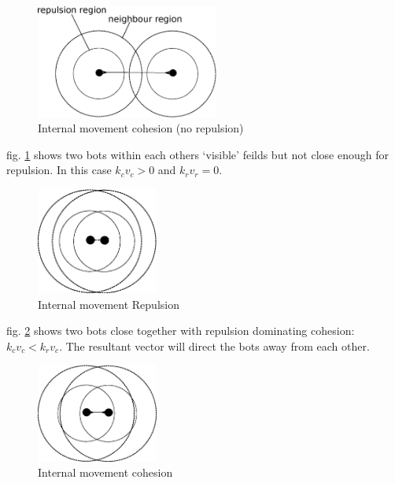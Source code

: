 \documentclass[10pt,journal,letterpaper,twoside]{IEEEtran}
\newcommand{\Stability}{Internal movement}
\newcommand{\Fig}{fig.}
\begin{document}
\begin{figure}[H]
\begin{center}
\includegraphics[width=6cm]{figures/Stability1}
\end{center}
\caption{\Stability{} cohesion (no repulsion)} \label{methods:Stability1}
\end{figure}

\Fig{} \ref{methods:Stability1} shows two bots within each others `visible' feilds but not close enough for repulsion.
In this case $k_cv_c > 0$ and $k_rv_r = 0$.

\begin{figure}[H]
\begin{center}
\includegraphics[width=4cm]{figures/Stability2}
\end{center}
\caption{\Stability{} Repulsion} \label{methods:Stability2}
\end{figure}

\Fig{} \ref{methods:Stability2} shows two bots close together with repulsion dominating cohesion: $k_cv_c < k_rv_c$. The resultant vector will direct the bots away from each other.

\begin{figure}[H]
\begin{center}
\includegraphics[width=4cm]{figures/Stability3}
\end{center}
\caption{\Stability{} cohesion} \label{methods:Stability3}
\end{figure}
\end{document}
